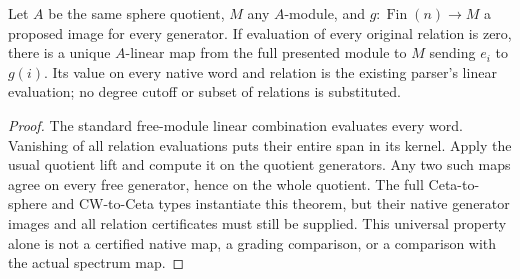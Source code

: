 \begin{proposition}
  \label{prop:lin-native-module-map-descent}
  \leanok
  Let $A$ be the same sphere quotient, $M$ any $A$-module, and
  $g:\operatorname{Fin}(n)\to M$ a proposed image for every generator.
  If evaluation of every original relation is zero, there is a unique
  $A$-linear map from the full presented module to $M$ sending $e_i$ to $g(i)$.
  Its value on every native word and relation is the existing parser's
  linear evaluation; no degree cutoff or subset of relations is substituted.
\end{proposition}
\begin{proof}
  \leanok
  The standard free-module linear combination evaluates every word.
  Vanishing of all relation evaluations puts their entire span in its kernel.
  Apply the usual quotient lift and compute it on the quotient generators.
  Any two such maps agree on every free generator, hence on the whole quotient.
  The full Ceta-to-sphere and CW-to-Ceta types instantiate this theorem,
  but their native generator images and all relation certificates must still
  be supplied. This universal property alone is not a certified native map,
  a grading comparison, or a comparison with the actual spectrum map.
\end{proof}

